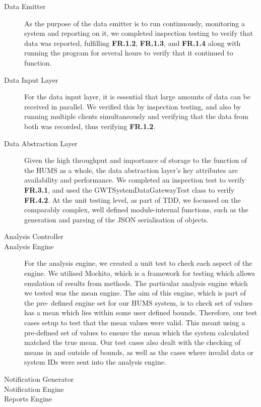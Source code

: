 \documentclass[10pt,a4paper]{article}
\newcommand{\fr}[1]{\textcolor{reqColor}{\textbf{FR.#1}}}
\begin{document}


\begin{description}
  \item[Data Emitter] As the purpose of the data emitter is to run
    continuously, monitoring a system and reporting on it, we completed
    inspection testing to verify that data was reported, fulfilling \fr{1.2},
    \fr{1.3}, and \fr{1.4} along with running the program for several hours to
    verify that it continued to function.

  \item[Data Input Layer] For the data input layer, it is essential that large
    amounts of data can be received in parallel. We verified this by
    inspection testing, and also by running multiple clients simultaneously and
    verifying that the data from both was recorded, thus verifying \fr{1.2}.

  \item[Data Abstraction Layer] Given the high throughput and
    importance of storage to the function of the HUMS as a whole, the
    data abstraction layer's key attributes are availability and
    performance. We completed an inspection test to verify \textbf{FR.3.1}, 
    and used the GWTSystemDataGatewayTest class 
    to verify \textbf{FR.4.2}. At the unit testing level, as 
    part of TDD,  we focussed on the comparably complex, well defined 
    module-internal functions, such as the generation and parsing of the 
    JSON serialisation of objects.
  \item[Analysis Controller]
  \item[Analysis Engine]
  For the analysis engine, we created a unit test to check each aspect of the 
engine. We utilised Mockito, which is a framework for testing which allows 
emulation of results from methods. The particular analysis engine which we 
tested was the mean engine. The aim of this engine, which is part of the pre-
defined engine set for our HUMS system, is to check set of values has a mean 
which lies within some user defined bounds. Therefore, our test cases setup to 
test that the mean values were valid. This meant using a pre-defined set of 
values to ensure the mean which the system calculated matched the true 
mean. Our test cases also dealt with the checking of means in and outside of 
bounds, as well as the cases where invalid data or system IDs were sent into 
the analysis engine.
  \item[Notification Generator]
  \item[Notification Engine]
  \item[Reports Engine]
 \end{description}
\end{document}
